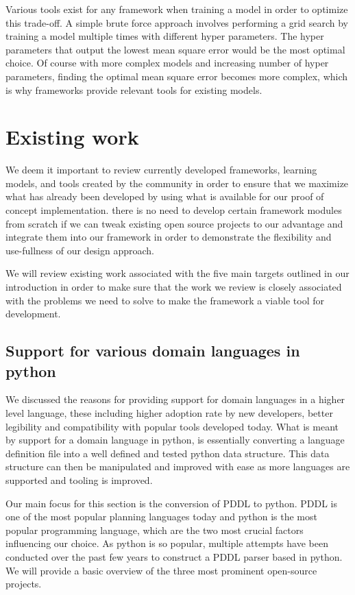 Various tools exist for any framework when training a model in order to optimize this trade-off. A simple brute force approach involves performing a grid search by training a model multiple times with different hyper parameters. The hyper parameters that output the lowest mean square error would be the most optimal choice. Of course with more complex models and increasing number of hyper parameters, finding the optimal mean square error becomes more complex, which is why frameworks provide relevant tools for existing models. 

\newpage

\section{Existing work}\label{background:Existing Work}
We deem it important to review currently developed frameworks, learning models, and tools created by the community in order to ensure that we maximize what has already been developed by using what is available for our proof of concept implementation. there is no need to develop certain framework modules from scratch if we can tweak existing open source projects to our advantage and integrate them into our framework in order to demonstrate the flexibility and use-fullness of our design approach. 

We will review existing work associated with the five main targets outlined in our introduction in order to make sure that the work we review is closely associated with the problems we need to solve to make the framework a viable tool for development. 

\subsection{Support for various domain languages in python}
We discussed the reasons for providing support for domain languages in a higher level language, these including higher adoption rate by new developers, better legibility and compatibility with popular tools developed today. What is meant by support for a domain language in python, is essentially converting a language definition file into a well defined and tested python data structure. This data structure can then be manipulated and improved with ease as more languages are supported and tooling is improved.

Our main focus for this section is the conversion of PDDL to python. PDDL is one of the most popular planning languages today and python is the most popular programming language, which are the two most crucial factors influencing our choice. As python is so popular, multiple attempts have been conducted over the past few years to construct a PDDL parser based in python. We will provide a basic overview of the three most prominent open-source projects.

